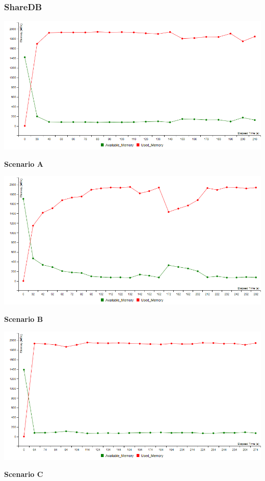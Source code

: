 \documentclass[12pt]{article}
\begin{document}
  \subsubsection{ShareDB}
  \begin{center}
    \includegraphics[scale=0.48]{sharedb_memory_S1.png}

    \textbf{Scenario A}
    
    \includegraphics[scale=0.48]{sharedb_memory_S2.png}
    
    \textbf{Scenario B}
    
    \includegraphics[scale=0.48]{sharedb_memory_S3.png}
    
    \textbf{Scenario C}
    
  \end{center}
\end{document}
